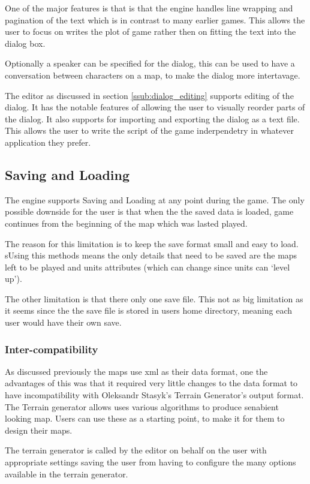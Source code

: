 One of the major features is that is that the engine handles line wrapping and pagination of the text which is in contrast to many earlier games. This allows the user to focus on writes the plot of game rather then on fitting the text into the dialog box. 

Optionally a speaker can be specified for the dialog, this can be used to have a conversation between characters on a map, to make the dialog more intertavage. 

The editor as discussed in section \ref{ssub:dialog_editing} supports editing of the dialog. It has the notable features of allowing the user to visually reorder parts of the dialog. It also supports for  importing and exporting the dialog as a text file.  This allows the user to write the script of the game inderpendetry in whatever application they prefer. 


\subsection{Saving and Loading}
The engine supports Saving and Loading at any point during the game. The only possible downside  for the user is that when the the saved data is loaded, game continues from the beginning of the map which was lasted played. 

The reason for this limitation is to keep the save format small and easy to load. sUsing this methods means the only details that need to be saved are the maps left to be played and units attributes (which can change since units can `level up'). 

The other limitation is that there only one save file. This not as big limitation as it seems since the the save file is stored in users home directory, meaning each user would have their own save.

\subsubsection{Inter-compatibility}
\label{ssub:intercompatibility}
As discussed previously the maps use xml as their data format, one the advantages of this was that it required very little changes to the data format to have incompatibility with Oleksandr Stasyk's  Terrain Generator's output format.  The Terrain generator allows uses various algorithms to produce senabient looking map. Users can use these as a starting point, to make it for them to design their maps.

The terrain generator is called by the editor on behalf on the user with appropriate settings saving the user from having to configure the many options  available in the terrain generator.

